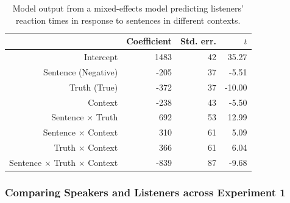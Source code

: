 \documentclass[man, floatsintext, noapacite]{apa6}
\begin{document}
\begin{table}
\caption{\label{tab: exp1_listenermodel} Model output from a mixed-effects model predicting listeners' reaction times in response to sentences in different contexts.}
\begin{center}
\begin{tabular}{rrrr}
  \hline
 & Coefficient & Std. err. & $t$ \\ 
  \hline
Intercept & 1483 & 42 & 35.27 \\ 
  Sentence (Negative) & -205 & 37 & -5.51  \\ 
  Truth (True) & -372 & 37 & -10.00 \\
  Context & -238 & 43 & -5.50 \\ 
  Sentence $\times$ Truth & 692 & 53 & 12.99 \\
  Sentence $\times$ Context & 310 & 61 & 5.09 \\
  Truth $\times$ Context & 366 & 61 & 6.04 \\
  Sentence $\times$ Truth $\times$ Context & -839 & 87 & -9.68 \\
   \hline
\end{tabular}
\end{center}
\end{table}

\subsubsection{Comparing Speakers and Listeners across Experiment 1}
\end{document}
